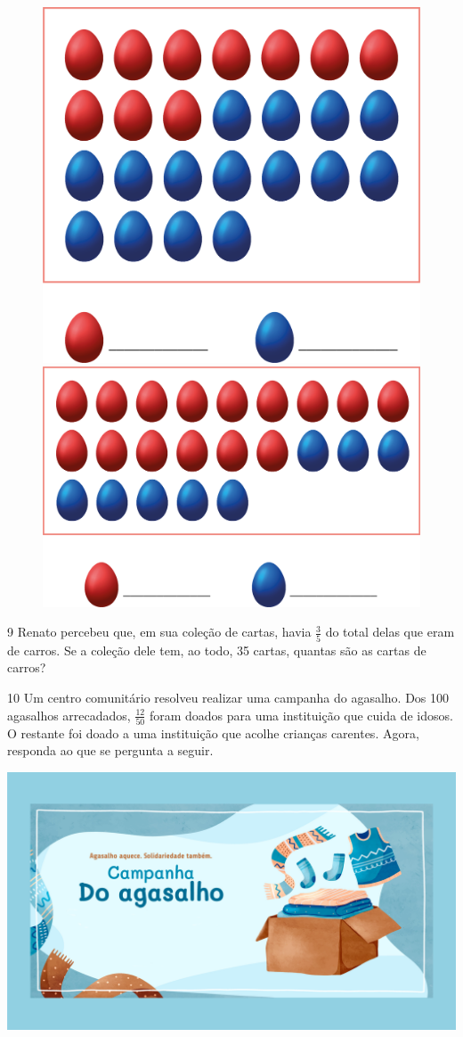 \begin{figure}[htpb!]
\centering
\includegraphics[width=.4\textwidth]{media/image64.png}
\includegraphics[width=.4\textwidth]{media/image65.png}
\end{figure}


\num{9} Renato percebeu que, em sua coleção de cartas, havia $\frac{3}{5}$ do total delas
que eram de carros. Se a coleção dele tem, ao todo, 35 cartas, quantas são
as cartas de carros?


\num{10} Um centro comunitário resolveu realizar uma campanha do agasalho. Dos
100 agasalhos arrecadados, $\frac{12}{50}$ foram doados para uma instituição que
cuida de idosos. O restante foi doado a uma instituição que acolhe
crianças carentes. Agora, responda ao que se pergunta a seguir.

\vspace{2em}
\includegraphics[width=\textwidth]{media/image65a.jpeg}

